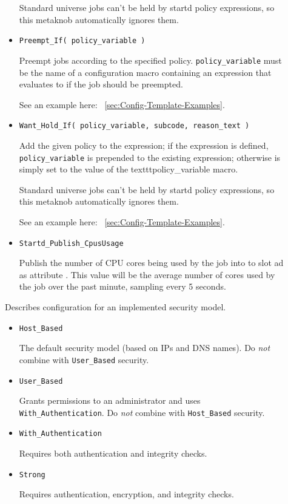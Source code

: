 \begin{description}
\begin{itemize}
	Standard universe jobs can't be held by startd policy expressions,
	so this metaknob automatically ignores them.

	\item \texttt{Preempt\_If( policy\_variable )}

	Preempt jobs according to the specified policy.
	\texttt{policy\_variable} must be the name of a configuration macro
	containing an expression that evaluates to  if the job
	should be preempted.

	See an example here: ~\ref{sec:Config-Template-Examples}.

	\item \texttt{Want\_Hold\_If( policy\_variable, subcode, reason\_text )}

	Add the given policy to the  expression; if the
	 expression is defined, \texttt{policy\_variable}
	is prepended to the existing expression; otherwise
	 is simply set to the value of the
	texttt{policy\_variable} macro.

	Standard universe jobs can't be held by startd policy expressions,
	so this metaknob automatically ignores them.

	See an example here: ~\ref{sec:Config-Template-Examples}.

	\item \texttt{Startd\_Publish\_CpusUsage}

	Publish the number of CPU cores being used by the job into
	to slot ad as attribute . This value will
	be the average number of cores used by the job over the
	past minute, sampling every 5 seconds.
  \end{itemize}

\label{usecategory:SECURITY}
\item[\MacroNI{SECURITY category}]
  Describes configuration for an implemented security model.
  \begin{itemize}
    \item \texttt{Host\_Based}

    The default security model (based on IPs and DNS names).
    Do \emph{not} combine with \texttt{User\_Based} security.

    \item \texttt{User\_Based}

    Grants permissions to an administrator and uses 
    \texttt{With\_Authentication}.
    Do \emph{not} combine with \texttt{Host\_Based} security.

    \item \texttt{With\_Authentication}

    Requires both authentication and integrity checks.

    \item \texttt{Strong}

    Requires authentication, encryption, and integrity checks.
  \end{itemize}

\end{description}

